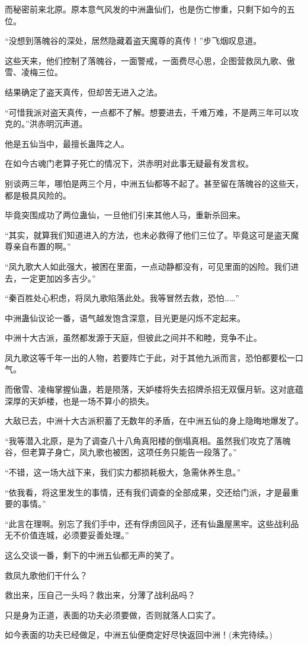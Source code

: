 \begin{this_body}
而秘密前来北原。原本意气风发的中洲蛊仙们，也是伤亡惨重，只剩下如今的五位。

“没想到落魄谷的深处，居然隐藏着盗天魔尊的真传！”步飞烟叹息道。

这些天来，他们控制了落魄谷，一面警戒，一面费尽心思，企图营救凤九歌、傲雪、凌梅三位。

结果确定了盗天真传，但却苦无进入之法。

“可惜我派对盗天真传，一点都不了解。想要进去，千难万难，不是两三年可以攻克的。”洪赤明沉声道。

他是五仙当中，最擅长蛊阵之人。

在如今古魂门老算子死亡的情况下，洪赤明对此事无疑最有发言权。

别谈两三年，哪怕是两三个月，中洲五仙都等不起了。甚至留在落魄谷的这些天，都是极具风险的。

毕竟突围成功了两位蛊仙，一旦他们引来其他人马，重新杀回来。

“其实，就算我们知道进入的方法，也未必救得了他们三位了。毕竟这可是盗天魔尊亲自布置的啊。”

“凤九歌大人如此强大，被困在里面，一点动静都没有，可见里面的凶险。我们进去，一定更加凶多吉少。”

“秦百胜处心积虑，将凤九歌陷落此处。我等冒然去救，恐怕……”

中洲蛊仙议论一番，语气越发饱含深意，目光更是闪烁不定起来。

中洲十大古派，虽然都发源于天庭，但彼此之间并不和睦，竞争不止。

凤九歌这等千年一出的人物，若要阵亡于此，对于其他九派而言，恐怕都要松一口气。

而傲雪、凌梅掌握仙蛊，若是陨落，天妒楼将失去招牌杀招无双偃月斩。这对底蕴深厚的天妒楼，也是一场不算小的损失。

大敌已去，中洲十大古派积蓄了无数年的矛盾，在中洲五仙的身上隐晦地爆发了。

“我等潜入北原，是为了调查八十八角真阳楼的倒塌真相。虽然我们攻克了落魄谷，但老算子身亡，凤九歌也被困，这项任务只能告一段落了。”

“不错，这一场大战下来，我们实力都损耗极大，急需休养生息。”

“依我看，将这里发生的事情，还有我们调查的全部成果，交还给门派，才是最重要的事情。”

“此言在理啊。别忘了我们手中，还有俘虏回风子，还有仙蛊屋黑牢。这些战利品无不价值连城，必须要妥善处理。”

这么交谈一番，剩下的中洲五仙都无声的笑了。

救凤九歌他们干什么？

救出来，压自己一头吗？救出来，分薄了战利品吗？

只是身为正道，表面的功夫必须要做，否则就落人口实了。

如今表面的功夫已经做足，中洲五仙便商定好尽快返回中洲！(未完待续。)

\end{this_body}

